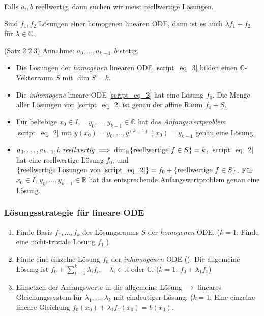 \documentclass[a4paper,10pt]{article}
\def\R{\mathbb{R}}
\def\C{\mathbb{C}}
\begin{document}
Falls \( a_i, b \) reellwertig, dann suchen wir meist reellwertige Lösungen.

Sind \( f_1, f_2 \) Lösungen einer homogenen linearen ODE, dann ist es auch \( \lambda f_1 + f_2 \) für \( \lambda \in \C \).

\begin{subbox}{(Satz 2.2.3)}
    Annahme: \( a_0, \dots, a_{k - 1}, b \) stetig.
    \begin{itemize}
        \item Die Lösungen der \emph{homogenen} linearen ODE \eqref{script_eq_3} bilden einen \( \C \)-Vektorraum \( S \) mit \( \dim S = k \).
        \item Die \emph{inhomogene} lineare ODE \eqref{script_eq_2} hat eine Lösung \( f_0 \). Die Menge aller Lösungen von \eqref{script_eq_2} ist genau der affine Raum \( f_0 + S \).
        \item Für beliebige \( x_0 \in I, \quad y_0, \dots, y_{k - 1} \in \C \) hat das \emph{Anfangswertproblem} \eqref{script_eq_2} mit \( y(x_0) = y_0, \dots, y^{(k - 1)}(x_0) = y_{k - 1} \) genau eine Lösung.
        \item \( a_0, \dots, a_{k - 1}, b \text{ \emph{reellwertig}}  \implies \dim_\R \{ \text{reellwertige } f \in S \} = k \), \eqref{script_eq_2} hat eine reellwertige Lösung \( f_0 \), und \( \{ \text{reellwertige Lösungen von \eqref{script_eq_2}} \} = f_0 + \{ \text{reellwertige } f \in S \} \). Für \( x_0 \in I, \, y_0, \dots, y_{k - 1} \in \R \) hat das entsprechende Anfangswertproblem genau eine Lösung.
    \end{itemize}
\end{subbox}

\subsubsection{Lösungsstrategie für lineare ODE}
\begin{enumerate}
    \item Finde Basis \( f_1, \dots, f_k \) des Lösungsraums \( S \) der \emph{homogenen} ODE. (\( k = 1 \): Finde eine nicht-triviale Lösung \( f_1 \).)
    \item Finde eine einzelne Lösung \( f_0 \) der \emph{inhomogenen} ODE (). Die allgemeine Lösung ist \( f_0 + \sum_{i = 1}^k \lambda_i f_i, \quad \lambda_i \in \R \text{ oder } \C \). (\( k = 1 \): \(f_0 + \lambda_1 f_1 \))
    \item Einsetzen der Anfangswerte in die allgemeine Lösung \( \rightarrow \) lineares Gleichungssystem für \( \lambda_1, \dots, \lambda_k \) mit eindeutiger Lösung. (\( k = 1 \): Eine einzelne lineare Gleichung \( f_0(x_0) + \lambda_1 f_1(x_0) = b(x_0) \).
\end{enumerate}
\end{document}
